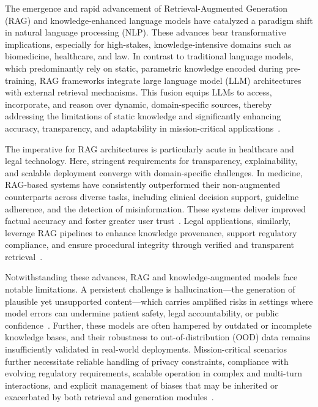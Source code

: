 \documentclass[sigconf]{acmart}
\begin{document}
The emergence and rapid advancement of Retrieval-Augmented Generation (RAG) and knowledge-enhanced language models have catalyzed a paradigm shift in natural language processing (NLP). These advances bear transformative implications, especially for high-stakes, knowledge-intensive domains such as biomedicine, healthcare, and law. In contrast to traditional language models, which predominantly rely on static, parametric knowledge encoded during pre-training, RAG frameworks integrate large language model (LLM) architectures with external retrieval mechanisms. This fusion equips LLMs to access, incorporate, and reason over dynamic, domain-specific sources, thereby addressing the limitations of static knowledge and significantly enhancing accuracy, transparency, and adaptability in mission-critical applications~\cite{ref4,ref5,ref10,ref14,ref15,ref16,ref17,ref46,ref47,ref48,ref51,ref52,ref54,ref55,ref64}.

The imperative for RAG architectures is particularly acute in healthcare and legal technology. Here, stringent requirements for transparency, explainability, and scalable deployment converge with domain-specific challenges. In medicine, RAG-based systems have consistently outperformed their non-augmented counterparts across diverse tasks, including clinical decision support, guideline adherence, and the detection of misinformation. These systems deliver improved factual accuracy and foster greater user trust~\cite{ref1,ref2,ref3,ref4,ref5,ref6,ref7,ref8,ref29,ref31,ref42,ref48,ref51,ref52,ref54,ref55,ref63}. Legal applications, similarly, leverage RAG pipelines to enhance knowledge provenance, support regulatory compliance, and ensure procedural integrity through verified and transparent retrieval~\cite{ref4,ref5,ref8,ref10,ref14,ref16}.

Notwithstanding these advances, RAG and knowledge-augmented models face notable limitations. A persistent challenge is hallucination—the generation of plausible yet unsupported content—which carries amplified risks in settings where model errors can undermine patient safety, legal accountability, or public confidence~\cite{ref15,ref38,ref45,ref46,ref47,ref50,ref52,ref54,ref55,ref64}. Further, these models are often hampered by outdated or incomplete knowledge bases, and their robustness to out-of-distribution (OOD) data remains insufficiently validated in real-world deployments. Mission-critical scenarios further necessitate reliable handling of privacy constraints, compliance with evolving regulatory requirements, scalable operation in complex and multi-turn interactions, and explicit management of biases that may be inherited or exacerbated by both retrieval and generation modules~\cite{ref15,ref38,ref45,ref46,ref47,ref50,ref52,ref54,ref55,ref64}.
\end{document}
